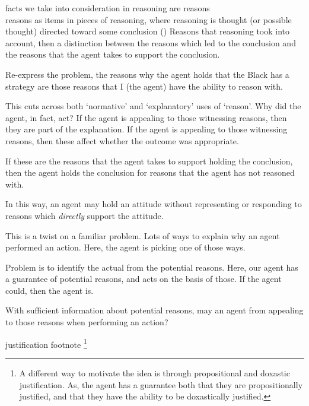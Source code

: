 \documentclass[10pt]{article}
\begin{document}
\begin{note}
  {
    \color{red}
    facts we take into consideration in reasoning are reasons \\
    reasons as items in pieces of reasoning, where reasoning is thought (or possible thought) directed toward some conclusion (\citeyear[421]{Hieronymi:2011aa})
  }
  Reasons that reasoning took into account, then a distinction between the reasons which led to the conclusion and the reasons that the agent takes to support the conclusion.


  Re-express the problem, the reasons why the agent holds that the Black has a strategy are those reasons that I (the agent) have the ability to reason with.

  This cuts across both `normative' and `explanatory' uses of `reason'.
  Why did the agent, in fact, act?
  If the agent is appealing to those witnessing reasons, then they are part of the explanation.
  If the agent is appealing to those witnessing reasons, then these affect whether the outcome was appropriate.
\end{note}

\begin{note}
  If these are the reasons that the agent takes to support holding the conclusion, then the agent holds the conclusion for reasons that the agent has not reasoned with.

  {
    \color{red}
    In this way, an agent may hold an attitude without representing or responding to reasons which \emph{directly} support the attitude.
  }
\end{note}


\begin{note}
  This is a twist on a familiar problem.
  Lots of ways to explain why an agent performed an action.
  Here, the agent is picking one of those ways.

  Problem is to identify the actual from the potential reasons.
  Here, our agent has a guarantee of potential reasons, and acts on the basis of those.
  If the agent could, then the agent is.

  With sufficient information about potential reasons, may an agent from appealing to those reasons when performing an action?

  justification footnote\nolinebreak
  \footnote{
    A different way to motivate the idea is through propositional and doxastic justification.
    As, the agent has a guarantee both that they are propositionally justified, and that they have the ability to be doxastically justified.
  }
\end{note}
\end{document}

